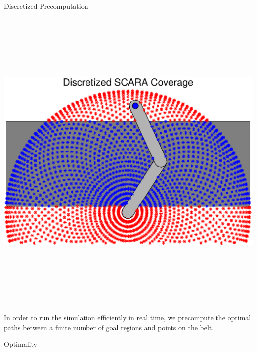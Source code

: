 \documentclass[final]{beamer}
\begin{document}
\begin{frame}{}
{\begin{columns}[t]
\begin{column}{.30\linewidth}
\begin{block}{\centering Discretized Precomputation}
\centering\includegraphics[height=16cm, width = 20cm]{figures/SCARA_coverage.eps}\\

In order to run the simulation efficiently in real time, we precompute the optimal paths between a 
finite number of goal regions and points on the belt. 


\end{block}
                

                
 \begin{block}{\centering Optimality}


\end{block}
\end{column}
\end{columns}}
\end{frame}
\end{document}
